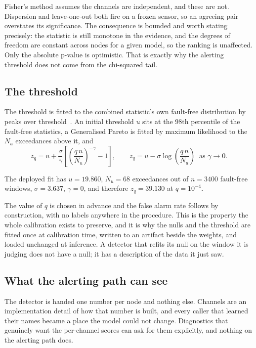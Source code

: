 \documentclass{article}
\begin{document}
Fisher's method assumes the channels are independent, and these are not.
Dispersion and leave-one-out both fire on a frozen sensor, so an agreeing pair
overstates its significance. The consequence is bounded and worth stating
precisely: the statistic is still monotone in the evidence, and the degrees of
freedom are constant across nodes for a given model, so the ranking is
unaffected. Only the absolute p-value is optimistic. That is exactly why the
alerting threshold does not come from the chi-squared tail.

\subsection{The threshold}
\label{sec:threshold}

The threshold is fitted to the combined statistic's own fault-free
distribution by peaks over threshold~\citep{siffer2017spot}. An initial
threshold $u$ sits at the 98th percentile of the fault-free statistics, a
Generalised Pareto is fitted by maximum likelihood to the $N_u$ exceedances
above it, and
\begin{equation}
  z_{q} = u + \frac{\sigma}{\gamma}\left[\left(\frac{q\,n}{N_{u}}\right)^{-\gamma} - 1\right],
  \qquad
  z_{q} = u - \sigma \log\!\left(\frac{q\,n}{N_{u}}\right) \ \text{ as } \gamma \to 0 .
\end{equation}

The deployed fit has $u = 19.860$, $N_u = 68$ exceedances out of $n = 3400$
fault-free windows, $\sigma = 3.637$, $\gamma = 0$, and therefore
$z_q = 39.130$ at $q = 10^{-4}$.

The value of $q$ is chosen in advance and the false alarm rate follows by
construction, with no labels anywhere in the procedure. This is the property
the whole calibration exists to preserve, and it is why the nulls and the
threshold are fitted once at calibration time, written to an artifact beside
the weights, and loaded unchanged at inference. A detector that refits its null
on the window it is judging does not have a null; it has a description of the
data it just saw.

\subsection{What the alerting path can see}
\label{sec:interface}

The detector is handed one number per node and nothing else. Channels are an
implementation detail of how that number is built, and every caller that
learned their names became a place the model could not change. Diagnostics that
genuinely want the per-channel scores can ask for them explicitly, and nothing
on the alerting path does.
\end{document}
